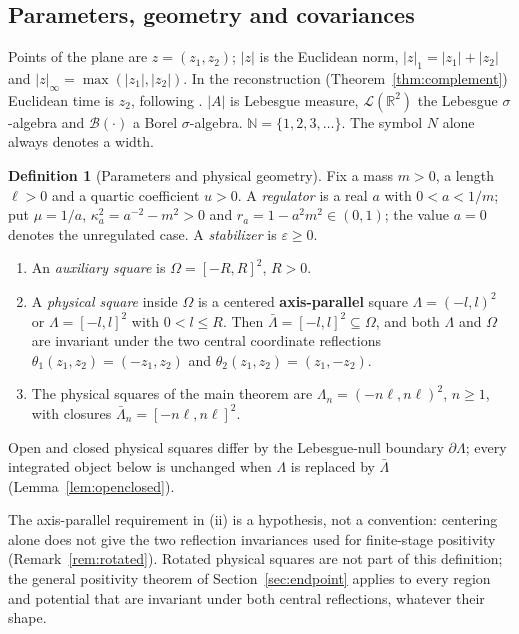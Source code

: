 \documentclass[11pt]{article}
\theoremstyle{plain}
\theoremstyle{definition}
\newtheorem{definition}[theorem]{Definition}
\theoremstyle{remark}
\newcommand{\R}{\mathbb{R}}
\newcommand{\N}{\mathbb{N}}
\newcommand{\cB}{\mathcal{B}}
\newcommand{\cL}{\mathcal{L}}
\begin{document}
\subsection{Parameters, geometry and covariances}\label{sec:params}

Points of the plane are $z=(z_1,z_2)$; $|z|$ is the Euclidean norm,
$|z|_1=|z_1|+|z_2|$ and $|z|_\infty=\max(|z_1|,|z_2|)$. In the reconstruction
(Theorem~\ref{thm:complement}) Euclidean time is $z_2$, following
\cite[p.~495]{FS1977}. $|A|$ is Lebesgue measure, $\cL(\R^{2})$ the Lebesgue
$\sigma$-algebra and $\cB(\cdot)$ a Borel $\sigma$-algebra.
$\N=\{1,2,3,\dots\}$. The symbol $N$ alone always denotes a width.

\begin{definition}[Parameters and physical geometry]\label{def:params}
Fix a mass $m>0$, a length $\ell>0$ and a quartic coefficient $u>0$. A
\emph{regulator} is a real $a$ with $0<a<1/m$; put $\mu=1/a$,
$\kappa_a^{2}=a^{-2}-m^{2}>0$ and $r_a=1-a^{2}m^{2}\in(0,1)$; the value $a=0$
denotes the unregulated case. A \emph{stabilizer} is $\varepsilon\ge0$.
\begin{enumerate}[label=(\roman*)]
\item An \emph{auxiliary square} is $\Omega=[-R,R]^{2}$, $R>0$.
\item A \emph{physical square} inside $\Omega$ is a centered
  \textbf{axis-parallel} square $\Lambda=(-l,l)^{2}$ or $\Lambda=[-l,l]^{2}$ with
  $0<l\le R$. Then $\bar\Lambda=[-l,l]^{2}\subseteq\Omega$, and both $\Lambda$ and
  $\Omega$ are invariant under the two central coordinate reflections
  $\theta_1(z_1,z_2)=(-z_1,z_2)$ and $\theta_2(z_1,z_2)=(z_1,-z_2)$.
\item The physical squares of the main theorem are
  $\Lambda_n=(-n\ell,n\ell)^{2}$, $n\ge1$, with closures
  $\bar\Lambda_n=[-n\ell,n\ell]^{2}$.
\end{enumerate}
Open and closed physical squares differ by the Lebesgue-null boundary
$\partial\Lambda$; every integrated object below is unchanged when $\Lambda$ is
replaced by $\bar\Lambda$ (Lemma~\ref{lem:openclosed}).
\end{definition}

The axis-parallel requirement in (ii) is a hypothesis, not a convention:
centering alone does not give the two reflection invariances used for
finite-stage positivity (Remark~\ref{rem:rotated}). Rotated physical squares are
not part of this definition; the general positivity theorem of
Section~\ref{sec:endpoint} applies to every region and potential that are
invariant under both central reflections, whatever their shape.
\end{document}
